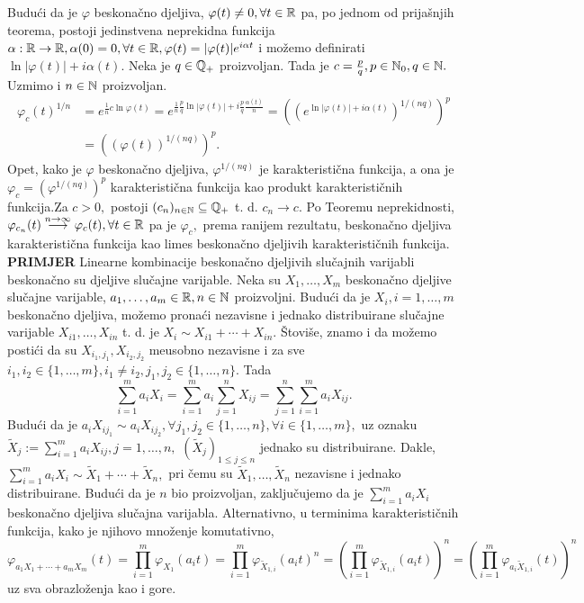 \documentclass{article}
\begin{document}
Budući da je \(\varphi\) beskonačno djeljiva, \(\varphi(t)\ne0,\forall t\in\Bbb R\) pa, po jednom od prijašnjih teorema, postoji jedinstvena neprekidna funkcija \(\alpha:\Bbb R\to\Bbb R,\alpha(0)=0,\forall t\in\Bbb R,\varphi(t)=|\varphi(t)|e^{i\alpha t}\) i možemo definirati \(\ln|\varphi(t)|+i\alpha(t).\) Neka je \(q\in\Bbb Q_+\) proizvoljan. Tada je \(c=\frac{p}q,p\in\Bbb N_0,q\in\Bbb N.\) Uzmimo i \(n\in\Bbb N\) proizvoljan.  \[\begin{aligned}\varphi_c(t)^{1/n}&=e^{\frac1nc\ln\varphi(t)}=e^{\frac1n\frac{p}q\ln|\varphi(t)|+i\frac{p}q\frac{\alpha(t)}n}=\left(\left(e^{\ln|\varphi(t)|+i\alpha(t)}\right)^{1/(nq)}\right)^p\\&=\left((\varphi(t))^{1/(nq)}\right)^p.\end{aligned}\] Opet, kako je \(\varphi\) beskonačno djeljiva, \(\varphi^{1/(nq)}\) je karakteristična funkcija, a ona je \(\varphi_c=\left(\varphi^{1/(nq)}\right)^p\) karakteristična funkcija kao produkt karakterističnih funkcija.\newline Za \(c>0,\) postoji \((c_n)_{n\in\Bbb N}\subseteq\Bbb Q_+\) t. d. \(c_n\to c.\) Po Teoremu neprekidnosti, \(\varphi_{c_n}(t)\overset{n\to\infty}{\longrightarrow}\varphi_c(t),\forall t\in\Bbb R\) pa je \(\varphi_c,\) prema ranijem rezultatu, beskonačno djeljiva karakteristična funkcija kao limes beskonačno djeljivih karakterističnih funkcija.\newline\newline
\textbf{PRIMJER}\newline
Linearne kombinacije beskonačno djeljivih slučajnih varijabli beskonačno su djeljive slučajne varijable.\newline\newline
Neka su \(X_1,\ldots,X_m\) beskonačno djeljive slučajne varijable, \(a_1,\ldots,a_m\in\Bbb R,n\in\Bbb N\) proizvoljni. Budući da je \(X_i,i=1,\ldots,m\) beskonačno djeljiva, možemo pronaći nezavisne i jednako distribuirane slučajne varijable \(X_{i1},\ldots, X_{in}\) t. d. je \(X_i\sim X_{i1}+\cdots+X_{in}.\) Štoviše, znamo i da možemo postići da su \(X_{i_1,j_1},X_{i_2,j_2}\) me\dj{}usobno nezavisne i za sve \(i_1,i_2\in\{1,\ldots,m\},i_1\ne i_2,j_1,j_2\in\{1,\ldots,n\}.\) Tada \[\sum_{i=1}^ma_iX_i=\sum_{i=1}^ma_i\sum_{j=1}^nX_{ij}=\sum_{j=1}^n\sum_{i=1}^ma_iX_{ij}.\] Budući da je \(a_iX_{ij_1}\sim a_iX_{ij_2},\forall j_1,j_2\in\{1,\ldots,n\},\forall i\in\{1,\ldots,m\},\) uz oznaku \(\tilde X_j:=\sum_{i=1}^ma_iX_{ij},j=1,\ldots,n,\) \((\tilde X_j)_{1\le j\le n}\) jednako su distribuirane.  Dakle, \(\sum_{i=1}^ma_iX_i\sim\tilde X_1+\cdots+\tilde X_n,\) pri čemu su \(\tilde X_1,\ldots,\tilde X_n\) nezavisne i jednako distribuirane. Budući da je \(n\) bio proizvoljan, zaključujemo da je \(\sum_{i=1}^ma_iX_i\) beskonačno djeljiva slučajna varijabla. Alternativno, u terminima karakterističnih funkcija, kako je njihovo množenje komutativno, \[\varphi_{a_1X_1+\cdots+a_mX_m}(t)=\prod_{i=1}^m\varphi_{X_1}(a_it)=\prod_{i=1}^m\varphi_{\tilde X_{1,i}}(a_it)^n=\left(\prod_{i=1}^m\varphi_{\tilde X_{1,i}}(a_it)\right)^n=\left(\prod_{i=1}^m\varphi_{a_i\tilde X_{1,i}}(t)\right)^n\] uz sva obrazloženja kao i gore.\newline\newline
\newpage
\end{document}
